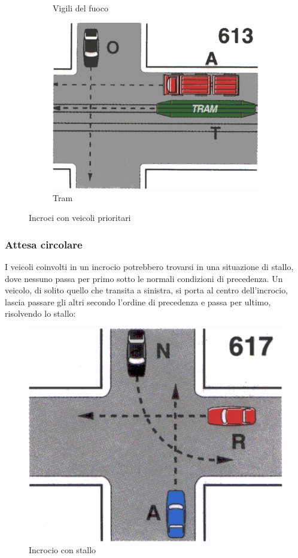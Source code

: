 \begin{figure}[htbp!]
\begin{subfigure}{.3\textwidth}
		\caption{Vigili del fuoco}
		\label{fig:fire}
	\end{subfigure}
	\begin{subfigure}{.3\textwidth}
		\includegraphics[width=\textwidth]{./images/tram}
		\caption{Tram}
		\label{fig:tram}
	\end{subfigure}
	\caption{Incroci con veicoli prioritari}
	\label{fig:prior}
\end{figure}

\subsubsection{Attesa circolare}
I veicoli coinvolti in un incrocio potrebbero trovarsi in una situazione di stallo, dove nessuno passa per primo sotto le normali condizioni di precedenza. Un veicolo, di solito quello che transita a sinistra, si porta al centro dell'incrocio, lascia passare gli altri secondo l'ordine di precedenza e passa per ultimo, risolvendo lo stallo:

\begin{figure}[htb]
	\centering
	\includegraphics[width=.5\textwidth]{images/lock}
	\caption{Incrocio con stallo}
\end{figure}

